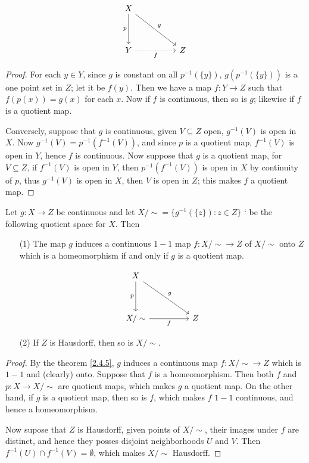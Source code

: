 \[\begin{tikzcd}
	X \\
	\\
	Y && Z
	\arrow["g", from=1-1, to=3-3]
	\arrow["f"', dotted, from=3-1, to=3-3]
	\arrow["p"', from=1-1, to=3-1]
\end{tikzcd}\]

\begin{proof}
    For each $y \in Y$, since  $g$ is constant on all  $p^{-1}(\{y\})$,
    $g(p^{-1}(\{y\}))$ is a one
    point set in $Z$; let it be $f(y)$. Then we have a map $f:Y \rightarrow Z$ such that
    $f(p(x))=g(x)$ for each $x$. Now if  $f$ is continuous, then so is  $g$; likewise if  $f$ is a
    quotient map.

    Conversely, suppose that  $g$ is continuous, given  $V \subseteq Z$ open,  $g^{-1}(V)$ is open
    in $X$. Now  $g^{-1}(V)=p^{-1}(f^{-1}(V))$, and since $p$ is a quotient map,  $f^{-1}(V)$ is
    open in $Y$, hence  $f$ is continuous. Now suppose that  $g$ is a quotient map, for  $V
    \subseteq Z$, if  $f^{-1}(V)$ is open in $Y$, then  $p^{-1}(f^{-1}(V))$ is open in $X$ by
    continuity of  $p$, thus  $g^{-1}(V)$ is open in $X$, then  $V$ is open in  $Z$; this makes  $f$
    a quotient map.
\end{proof}
\begin{corollary}
    Let $g:X \rightarrow Z$ be continuous and let $X/\sim=\{g^{-1}(\{z\}):z \in Z\}$ ` be the
    following quotient space for $X$. Then
        \begin{enumerate}
            \item[(1)] The map $g$ induces a continuous  $1-1$ map  $f:X/\sim \rightarrow Z$ of  $X/\sim$
                onto  $Z$ which is a homeomorphism if and only if $g$ is a quotient map.

                \[\begin{tikzcd}
	                X \\
	                \\
	                {X/\sim} && Z
	                \arrow["p"', from=1-1, to=3-1]
	                \arrow["f"', from=3-1, to=3-3]
	                \arrow["g", from=1-1, to=3-3]
                    \end{tikzcd}\]

            \item[(2)] If $Z$ is Hausdorff, then so is  $X/\sim$.
        \end{enumerate}
\end{corollary}
\begin{proof}
    By the theorem \ref{2.4.5}, $g$ induces a continuous map  $f:X/\sim \rightarrow Z$ which is
    $1-1$ and  (clearly) onto. Suppose that $f$ is a homeomorphism. Then both  $f$ and  $p:X
    \rightarrow X/\sim$ are quotient maps, which makes  $g$ a quotient map. On the other hand, if
    $g$ is a quotient map, then so is  $f$, which makes  $f$  $1-1$ continuous, and hence a
    homeomorphism.

    Now supose that  $Z$ is Hausdorff, given points of  $X/\sim$, their images under  $f$ are
    distinct, and hence they posses disjoint neighborhoods  $U$ and  $V$. Then  $f^{-1}(U) \cap
    f^{-1}(V)=\emptyset$, which makes $X/\sim$ Hausdorff.
\end{proof}

